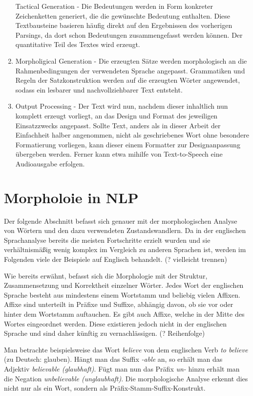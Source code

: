 \documentclass[12pt]{report}
\begin{document}
\begin{enumerate}
Tactical Generation - Die Bedeutungen werden in Form konkreter Zeichenketten generiert, die die gewünschte Bedeutung enthalten. Diese Textbausteine basieren häufig direkt auf den Ergebnissen des vorherigen Parsings, da dort schon Bedeutungen zusammengefasst werden können. Der quantitative Teil des Textes wird erzeugt.
\item
Morpholigical Generation - Die erzeugten Sätze werden morphologisch an die Rahmenbedingungen der verwendeten Sprache angepasst. Grammatiken und Regeln der Satzkonstruktion werden auf die erzeugten Wörter angewendet, sodass ein lesbarer und nachvollziehbarer Text entsteht.
\item
Output Processing - Der Text wird nun, nachdem dieser inhaltlich nun komplett erzeugt vorliegt, an das Design und Format des jeweiligen Einsatzzwecks angepasst. Sollte Text, anders als in dieser Arbeit der Einfachheit halber angenommen, nicht als geschriebenes Wort ohne besondere Formatierung vorliegen, kann dieser einem Formatter zur Designanpassung übergeben werden. Ferner kann etwa mihilfe von Text-to-Speech eine Audioausgabe erfolgen. 
\end{enumerate}

\section{Morpholoie in NLP}
Der folgende Abschnitt befasst sich genauer mit der morphologischen Analyse von Wörtern und den dazu verwendeten Zustandswandlern. Da in der englischen Sprachanalyse bereits die meisten Fortschritte erzielt wurden und sie verhältnismäßig wenig komplex im Vergleich zu anderen Sprachen ist, werden im Folgenden viele der Beispiele auf Englisch behandelt. (? vielleicht trennen)

Wie bereits erwähnt, befasst sich die Morphologie mit der Struktur, Zusammensetzung und Korrektheit einzelner Wörter. Jedes Wort der englischen Sprache besteht aus mindestens einem Wortstamm und beliebig vielen Affixen. Affixe sind unterteilt in Präfixe und Suffixe, abhängig davon, ob sie vor oder hinter dem Wortstamm auftauchen. Es gibt auch Affixe, welche in der Mitte des Wortes eingeordnet werden. Diese existieren jedoch nicht in der englischen Sprache und sind daher künftig zu vernachlässigen. (? Reihenfolge)

Man betrachte beispielsweise das Wort \textit{\glqq  believe\grqq{}} von dem englischen Verb \textit{\glqq  to believe\grqq{}} (zu Deutsch: \glqq  glauben\grqq{}). Hängt man das Suffix \textit{\glqq  -able\grqq{}} an, so erhält man das Adjektiv \textit{\glqq  believable\grqq{} (\glqq  glaubhaft\grqq{})}. Fügt man nun das Präfix \textit{\glqq  un-\grqq{}} hinzu erhält man die Negation \textit{\glqq  unbelievable\grqq{} (\glqq  unglaubhaft\grqq{})}. Die morphologische Analyse erkennt dies nicht nur als ein Wort, sondern als Präfix-Stamm-Suffix-Konstrukt.
\end{document}
